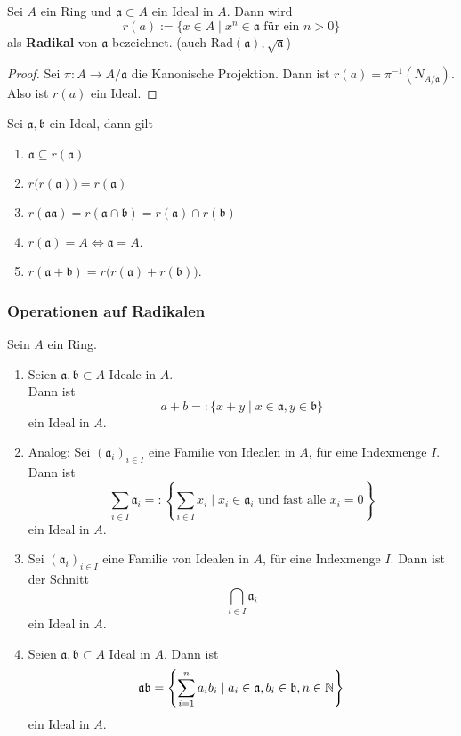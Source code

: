 	\begin{definition}
		Sei $A$ ein Ring und $\mathfrak a\subset A$ ein Ideal in $A$. Dann wird
		\[r(a):=\{x\in A\mid \text{$x^n\in \mathfrak a$ für ein $n>0$}\}\]
		als \textbf{Radikal} von $\mathfrak a$ bezeichnet. (auch $\mathrm{Rad}(\mathfrak a),\sqrt{\mathfrak a}$)
	\end{definition}
	\begin{proof}
		Sei $\pi:A\to A/\mathfrak a$ die Kanonische Projektion. Dann ist $r(a)=\pi^{-1}\left(N_{A/\mathfrak a}\right)$.\\
		Also ist $r(a)$ ein Ideal.
	\end{proof}
	
	\begin{satz}
		Sei $\mathfrak a,\mathfrak b$ ein Ideal, dann gilt
		\begin{enumerate}
			\item $\mathfrak a\subseteq r(\mathfrak a)$
			\item $r\big(r(\mathfrak a)\big)=r(\mathfrak a)$
			\item $r(\mathfrak a\mathfrak a)=r(\mathfrak a\cap \mathfrak b)=r(\mathfrak a)\cap r(\mathfrak b)$
			\item $r(\mathfrak a)=A\Leftrightarrow\mathfrak a=A$.
			\item $r(\mathfrak a+\mathfrak b)=r\big(r(\mathfrak a)+r(\mathfrak b)\big)$.
		\end{enumerate}
	\end{satz}

	\subsubsection{Operationen auf Radikalen}
	\begin{definition}
		Sein $A$ ein Ring.
		\begin{enumerate}
			\item Seien $\mathfrak a,\mathfrak b\subset A$ Ideale in $A$.\\
			Dann ist
			\[a+b=:\{x+y\mid x\in\mathfrak{a},y\in\mathfrak{b}\}\]
			ein Ideal in $A$.
			\item Analog: Sei $(\mathfrak{a}_i)_{i\in I}$ eine Familie von Idealen in $A$, für eine Indexmenge $I$. Dann ist
			\[\sum_{i\in I}\mathfrak{a}_i=:\left\{\sum_{i\in I}x_i\mid \text{$x_i\in \mathfrak{a}_i$ und fast alle $x_i=0$}\right\}\]
			ein Ideal in $A$.
			\item Sei $(\mathfrak{a}_i)_{i\in I}$ eine Familie von Idealen in $A$, für eine Indexmenge $I$. Dann ist der Schnitt
			\[\bigcap_{i\in I}\mathfrak a_i\]
			ein Ideal in $A$.
			\item Seien $\mathfrak a,\mathfrak b\subset A$ Ideal in $A$. Dann ist
			\[\mathfrak a\mathfrak b=\left\{\sum_{i=1}^{n}a_ib_i\mid a_i\in\mathfrak a,b_i\in\mathfrak b,n\in\mathbb{N}\right\}\] 
			ein Ideal in $A$.
		\end{enumerate}
	\end{definition}

